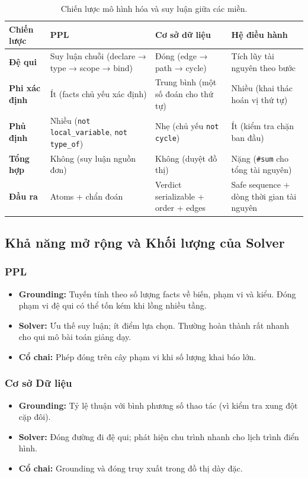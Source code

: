 \documentclass[a4paper,11pt]{article}
\begin{document}
\begin{table}[H]
\centering
\small
\begin{tabular}{|l|p{3cm}|p{3cm}|p{3cm}|}
\hline
\textbf{Chiến lược} & \textbf{PPL} & \textbf{Cơ sở dữ liệu} & \textbf{Hệ điều hành} \\
\hline
\textbf{Đệ qui} &
  Suy luận chuỗi (declare → type → scope → bind) &
  Đóng (edge → path → cycle) &
  Tích lũy tài nguyên theo bước \\
\hline
\textbf{Phi xác định} &
  Ít (facts chủ yếu xác định) &
  Trung bình (một số đoán cho thứ tự) &
  Nhiều (khai thác hoán vị thứ tự) \\
\hline
\textbf{Phủ định} &
  Nhiều (\texttt{not local\_variable}, \texttt{not type\_of}) &
  Nhẹ (chủ yếu \texttt{not cycle}) &
  Ít (kiểm tra chặn ban đầu) \\
\hline
\textbf{Tổng hợp} &
  Không (suy luận nguồn đơn) &
  Không (duyệt đồ thị) &
  Nặng (\texttt{\#sum} cho tổng tài nguyên) \\
\hline
\textbf{Đầu ra} &
  Atoms + chẩn đoán &
  Verdict serializable + order + edges &
  Safe sequence + dòng thời gian tài nguyên \\
\hline
\end{tabular}
\caption{Chiến lược mô hình hóa và suy luận giữa các miền.}
\label{tab:strategies}
\end{table}

\subsection{Khả năng mở rộng và Khối lượng của Solver}

\subsubsection*{PPL}
\begin{itemize}
  \item \textbf{Grounding:} Tuyến tính theo số lượng facts về biến, phạm vi và kiểu. Đóng phạm vi đệ qui có thể tốn kém khi lồng nhiều tầng.
  \item \textbf{Solver:} Ưu thế suy luận; ít điểm lựa chọn. Thường hoàn thành rất nhanh cho qui mô bài toán giảng dạy.
  \item \textbf{Cổ chai:} Phép đóng trên cây phạm vi khi số lượng khai báo lớn.
\end{itemize}

\subsubsection*{Cơ sở Dữ liệu}
\begin{itemize}
  \item \textbf{Grounding:} Tỷ lệ thuận với bình phương số thao tác (vì kiểm tra xung đột cặp đôi).
  \item \textbf{Solver:} Đóng đường đi đệ qui; phát hiện chu trình nhanh cho lịch trình điển hình.
  \item \textbf{Cổ chai:} Grounding và đóng truy xuất trong đồ thị dày đặc.
\end{itemize}
\end{document}

